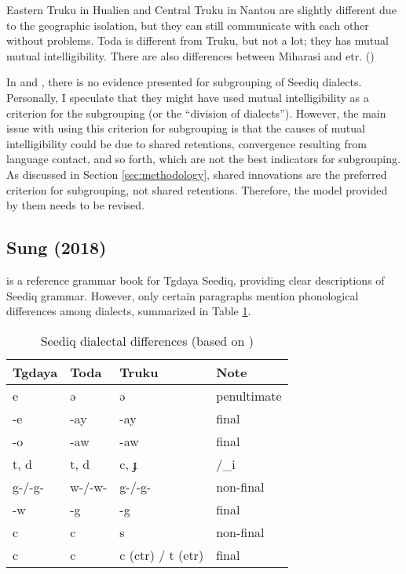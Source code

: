 Eastern Truku in Hualien and Central Truku in Nantou are slightly different due to the geographic isolation, but they can still communicate with each other without problems. Toda is different from Truku, but not a lot; they has mutual mutual intelligibility. There are also differences between Miharasi and \acl{etr}. (\cites[4]{Chengetal2017Truku}[5]{Chengetal2019Tgdaya})

In \textcite{Chengetal2017Truku} and \textcite{Chengetal2019Tgdaya}, there is no evidence presented for subgrouping of Seediq dialects. Personally, I speculate that they might have used mutual intelligibility as a criterion for the subgrouping (or the ``division of dialects''). However, the main issue with using this criterion for subgrouping is that the causes of mutual intelligibility could be due to shared retentions, convergence resulting from language contact, and so forth, which are not the best indicators for subgrouping. As discussed in Section \ref{sec:methodology}, shared innovations are the preferred criterion for subgrouping, not shared retentions. Therefore, the model provided by them needs to be revised.

\subsection{Sung (2018)}

\textcite{Sung2018Sedgrammar} is a reference grammar book for Tgdaya Seediq, providing clear descriptions of Seediq grammar. However, only certain paragraphs mention phonological differences among dialects, summarized in Table \ref{tab:sung2018}.

\begin{table}[!htbp]
\centering
\caption{Seediq dialectal differences (based on \cite[21--22]{Sung2018Sedgrammar})}
\label{tab:sung2018}
\begin{tabular}{llll}
\hline
Tgdaya & Toda   & Truku                       & Note        \\ \hline
e      & ə      & ə                           & penultimate \\
-e     & -ay    & -ay                         & final       \\
-o     & -aw    & -aw                         & final       \\
t, d   & t, d   & c, ɟ                        & /\_i        \\
g-/-g- & w-/-w- & g-/-g-                      & non-final   \\
-w     & -g     & -g                          & final       \\
c      & c      & s                           & non-final   \\
c      & c      & c (\ac{ctr}) / t (\ac{etr}) & final       \\ \hline
\end{tabular}
\end{table}

